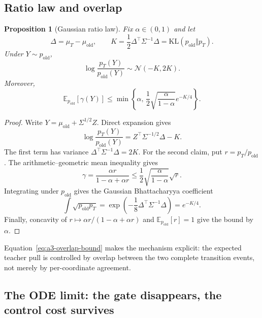 \documentclass[11pt,a4paper]{article}
\newcommand{\E}{\mathbb{E}}
\newcommand{\N}{\mathcal{N}}
\newcommand{\KL}{\mathrm{KL}}
\theoremstyle{plain}
\newtheorem{proposition}[theorem]{Proposition}
\theoremstyle{definition}
\begin{document}
\subsection{Ratio law and overlap}

\begin{proposition}[Gaussian ratio law]
\label{prop:a3-ratio-law}
Fix $\alpha\in(0,1)$ and let
\begin{equation}
\Delta=\mu_T-\mu_{\mathrm{old}},
\qquad
K=\frac12\Delta^\top\Sigma^{-1}\Delta
=\KL(p_{\mathrm{old}}\Vert p_T).
\label{eq:a3-K}
\end{equation}
Under $Y\sim p_{\mathrm{old}}$,
\begin{equation}
\log\frac{p_T(Y)}{p_{\mathrm{old}}(Y)}
\sim\N(-K,2K).
\label{eq:a3-ratio-law}
\end{equation}
Moreover,
\begin{equation}
\E_{p_{\mathrm{old}}}[\gamma(Y)]
\le
\min\!\left\{
\alpha,\,
\frac12\sqrt{\frac{\alpha}{1-\alpha}}e^{-K/4}
\right\}.
\label{eq:a3-overlap-bound}
\end{equation}
\end{proposition}

\begin{proof}
Write $Y=\mu_{\mathrm{old}}+\Sigma^{1/2}Z$.  Direct expansion gives
\[
\log\frac{p_T(Y)}{p_{\mathrm{old}}(Y)}
=Z^\top\Sigma^{-1/2}\Delta-K.
\]
The first term has variance $\Delta^\top\Sigma^{-1}\Delta=2K$.  For the second claim, put
$r=p_T/p_{\mathrm{old}}$.  The arithmetic--geometric mean inequality gives
\[
\gamma
=\frac{\alpha r}{1-\alpha+\alpha r}
\le
\frac12\sqrt{\frac{\alpha}{1-\alpha}}\sqrt r.
\]
Integrating under $p_{\mathrm{old}}$ gives the Gaussian Bhattacharyya coefficient
\[
\int\sqrt{p_{\mathrm{old}}p_T}
=
\exp\!\left(-\frac18\Delta^\top\Sigma^{-1}\Delta\right)
=e^{-K/4}.
\]
Finally, concavity of
$r\mapsto\alpha r/(1-\alpha+\alpha r)$ and $\E_{p_{\mathrm{old}}}[r]=1$
give the bound by $\alpha$.
\end{proof}

Equation~\eqref{eq:a3-overlap-bound} makes the mechanism explicit: the expected teacher pull is
controlled by overlap between the two complete transition events, not merely by per-coordinate
agreement.

\subsection{The ODE limit: the gate disappears, the control cost survives}
\end{document}
